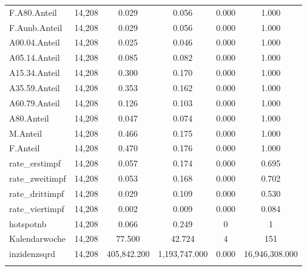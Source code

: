 \documentclass{article}
\begin{document}
\begin{table}[!htbp]
\begin{tabular}{@{\extracolsep{5pt}}lccccc}
F.A80.Anteil & 14,208 & 0.029 & 0.056 & 0.000 & 1.000 \\ 
F.Aunb.Anteil & 14,208 & 0.029 & 0.056 & 0.000 & 1.000 \\ 
A00.04.Anteil & 14,208 & 0.025 & 0.046 & 0.000 & 1.000 \\ 
A05.14.Anteil & 14,208 & 0.085 & 0.082 & 0.000 & 1.000 \\ 
A15.34.Anteil & 14,208 & 0.300 & 0.170 & 0.000 & 1.000 \\ 
A35.59.Anteil & 14,208 & 0.353 & 0.162 & 0.000 & 1.000 \\ 
A60.79.Anteil & 14,208 & 0.126 & 0.103 & 0.000 & 1.000 \\ 
A80.Anteil & 14,208 & 0.047 & 0.074 & 0.000 & 1.000 \\ 
M.Anteil & 14,208 & 0.466 & 0.175 & 0.000 & 1.000 \\ 
F.Anteil & 14,208 & 0.470 & 0.176 & 0.000 & 1.000 \\ 
rate\_erstimpf & 14,208 & 0.057 & 0.174 & 0.000 & 0.695 \\ 
rate\_zweitimpf & 14,208 & 0.053 & 0.168 & 0.000 & 0.702 \\ 
rate\_drittimpf & 14,208 & 0.029 & 0.109 & 0.000 & 0.530 \\ 
rate\_viertimpf & 14,208 & 0.002 & 0.009 & 0.000 & 0.084 \\ 
hotspotnb & 14,208 & 0.066 & 0.249 & 0 & 1 \\ 
Kalendarwoche & 14,208 & 77.500 & 42.724 & 4 & 151 \\ 
inzidenzsqrd & 14,208 & 405,842.200 & 1,193,747.000 & 0.000 & 16,946,308.000 \\ 
\hline \\[-1.8ex] 
\end{tabular} 
\end{table} 
\end{document}
